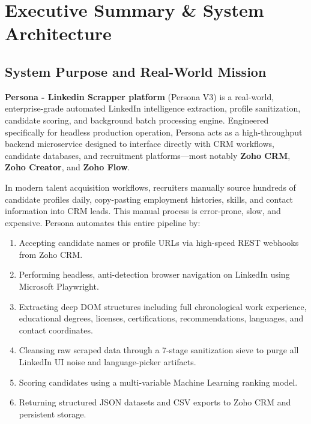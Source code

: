 \documentclass[11pt,a4paper]{report}
\begin{document}
\tableofcontents
\newpage
\listoffigures
\newpage
\listoftables
\newpage

\chapter{Executive Summary \& System Architecture}

\section{System Purpose and Real-World Mission}
\textbf{Persona - Linkedin Scrapper platform} (Persona V3) is a real-world, enterprise-grade automated LinkedIn intelligence extraction, profile sanitization, candidate scoring, and background batch processing engine. Engineered specifically for headless production operation, Persona acts as a high-throughput backend microservice designed to interface directly with CRM workflows, candidate databases, and recruitment platforms---most notably \textbf{Zoho CRM}, \textbf{Zoho Creator}, and \textbf{Zoho Flow}.

In modern talent acquisition workflows, recruiters manually source hundreds of candidate profiles daily, copy-pasting employment histories, skills, and contact information into CRM leads. This manual process is error-prone, slow, and expensive. Persona automates this entire pipeline by:
\begin{enumerate}[leftmargin=*]
    \item Accepting candidate names or profile URLs via high-speed REST webhooks from Zoho CRM.
    \item Performing headless, anti-detection browser navigation on LinkedIn using Microsoft Playwright.
    \item Extracting deep DOM structures including full chronological work experience, educational degrees, licenses, certifications, recommendations, languages, and contact coordinates.
    \item Cleansing raw scraped data through a 7-stage sanitization sieve to purge all LinkedIn UI noise and language-picker artifacts.
    \item Scoring candidates using a multi-variable Machine Learning ranking model.
    \item Returning structured JSON datasets and CSV exports to Zoho CRM and persistent storage.
\end{enumerate}
\end{document}
